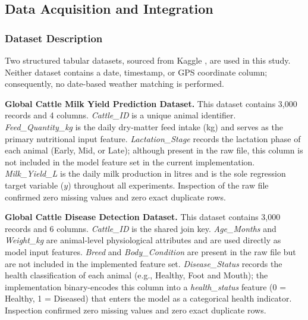 \documentclass[conference]{IEEEtran}
\begin{document}
	\subsection{Data Acquisition and Integration}

	\subsubsection{Dataset Description}
	Two structured tabular datasets, sourced from Kaggle \cite{ref13}, are used in this study.
	Neither dataset contains a date, timestamp, or GPS coordinate column; consequently, no
	date-based weather matching is performed.

	\textbf{Global Cattle Milk Yield Prediction Dataset.}
	This dataset contains 3,000 records and 4 columns.
	\textit{Cattle\_ID} is a unique animal identifier.
	\textit{Feed\_Quantity\_kg} is the daily dry-matter feed intake (kg) and
	serves as the primary nutritional input feature.
	\textit{Lactation\_Stage} records the lactation phase of each animal
	(Early, Mid, or Late); although present in the raw file, this column is not
	included in the model feature set in the current implementation.
	\textit{Milk\_Yield\_L} is the daily milk production in litres and is the
	sole regression target variable ($y$) throughout all experiments.
	Inspection of the raw file confirmed zero missing values and zero exact
	duplicate rows.

	\textbf{Global Cattle Disease Detection Dataset.}
	This dataset contains 3,000 records and 6 columns.
	\textit{Cattle\_ID} is the shared join key.
	\textit{Age\_Months} and \textit{Weight\_kg} are animal-level physiological
	attributes and are used directly as model input features.
	\textit{Breed} and \textit{Body\_Condition} are present in the raw file
	but are not included in the implemented feature set.
	\textit{Disease\_Status} records the health classification of each animal
	(e.g., Healthy, Foot and Mouth); the implementation binary-encodes this
	column into a \textit{health\_status} feature (0 = Healthy, 1 = Diseased)
	that enters the model as a categorical health indicator.
	Inspection confirmed zero missing values and zero exact duplicate rows.
\end{document}
